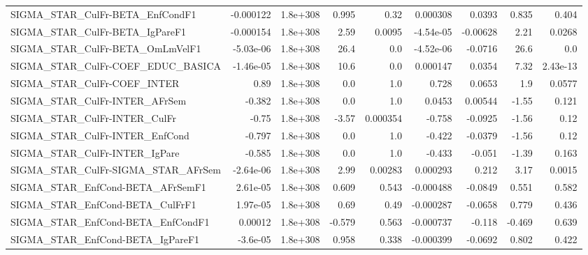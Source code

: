 \begin{tabular}{lrrrrrrrr}
SIGMA\_STAR\_CulFr-BETA\_EnfCondF1       &   -0.000122 &     1.8e+308 &   0.995 &     0.32 &   0.000308 &      0.0393 &        0.835 &         0.404 \\
SIGMA\_STAR\_CulFr-BETA\_IgPareF1        &   -0.000154 &     1.8e+308 &    2.59 &   0.0095 &  -4.54e-05 &    -0.00628 &         2.21 &        0.0268 \\
SIGMA\_STAR\_CulFr-BETA\_OmLmVelF1       &   -5.03e-06 &     1.8e+308 &    26.4 &      0.0 &  -4.52e-06 &     -0.0716 &         26.6 &           0.0 \\
SIGMA\_STAR\_CulFr-COEF\_EDUC\_BASICA     &   -1.46e-05 &     1.8e+308 &    10.6 &      0.0 &   0.000147 &      0.0354 &         7.32 &      2.43e-13 \\
SIGMA\_STAR\_CulFr-COEF\_INTER           &        0.89 &     1.8e+308 &     0.0 &      1.0 &      0.728 &      0.0653 &          1.9 &        0.0577 \\
SIGMA\_STAR\_CulFr-INTER\_AFrSem         &      -0.382 &     1.8e+308 &     0.0 &      1.0 &     0.0453 &     0.00544 &        -1.55 &         0.121 \\
SIGMA\_STAR\_CulFr-INTER\_CulFr          &       -0.75 &     1.8e+308 &   -3.57 & 0.000354 &     -0.758 &     -0.0925 &        -1.56 &          0.12 \\
SIGMA\_STAR\_CulFr-INTER\_EnfCond        &      -0.797 &     1.8e+308 &     0.0 &      1.0 &     -0.422 &     -0.0379 &        -1.56 &          0.12 \\
SIGMA\_STAR\_CulFr-INTER\_IgPare         &      -0.585 &     1.8e+308 &     0.0 &      1.0 &     -0.433 &      -0.051 &        -1.39 &         0.163 \\
SIGMA\_STAR\_CulFr-SIGMA\_STAR\_AFrSem    &   -2.64e-06 &     1.8e+308 &    2.99 &  0.00283 &   0.000293 &       0.212 &         3.17 &        0.0015 \\
SIGMA\_STAR\_EnfCond-BETA\_AFrSemF1      &    2.61e-05 &     1.8e+308 &   0.609 &    0.543 &  -0.000488 &     -0.0849 &        0.551 &         0.582 \\
SIGMA\_STAR\_EnfCond-BETA\_CulFrF1       &    1.97e-05 &     1.8e+308 &    0.69 &     0.49 &  -0.000287 &     -0.0658 &        0.779 &         0.436 \\
SIGMA\_STAR\_EnfCond-BETA\_EnfCondF1     &     0.00012 &     1.8e+308 &  -0.579 &    0.563 &  -0.000737 &      -0.118 &       -0.469 &         0.639 \\
SIGMA\_STAR\_EnfCond-BETA\_IgPareF1      &    -3.6e-05 &     1.8e+308 &   0.958 &    0.338 &  -0.000399 &     -0.0692 &        0.802 &         0.422 \\

\end{tabular}
